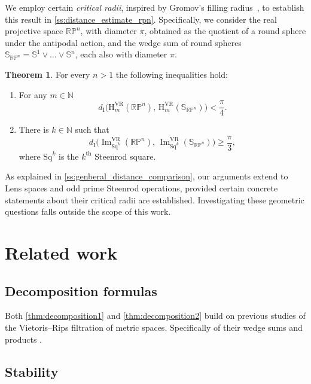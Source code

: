 \documentclass{amsart}
\theoremstyle{definition}
\newcommand{\N}{\mathbb{N}}
\renewcommand{\th}{\mathrm{th}}
\newcommand{\rH}{\mathrm{H}}
\newcommand{\bS}{\mathbb{S}}
\newcommand{\VR}{\mathrm{VR}}
\newcommand{\Sq}{\mathrm{Sq}}
\theoremstyle{theorem}
\newtheorem{introtheorem}{Theorem}
\DeclareMathOperator{\img}{Im}
\newcommand{\rp}{\mathbb{RP}}
\newcommand{\di}{d_{\mathrm{I}}}
\begin{document}
We employ certain \textit{critical radii}, inspired by Gromov's filling radius~\cite{gromov1983filling}, to establish this result in \cref{ss:distance_estimate_rpn}.
Specifically, we consider the real projective space \(\rp^n\), with diameter \(\pi\), obtained as the quotient of a round sphere under the antipodal action, and the wedge sum of round spheres \(\bS_{\mathbb{RP}^n} = \bS^1 \vee \dots \vee \bS^n\), each also with diameter \(\pi\).

\begin{introtheorem}\label{thm:inequalities intro}
	For every \(n > 1\) the following inequalities hold:
	\begin{enumerate}
		\item For any \(m \in \N\)
		\[
		\di\Big(\rH^\VR_m(\rp^n),\, \rH^\VR_m(\bS_{\rp^n})\Big) < \frac{\pi}{4}.
		\]

		\item There is \(k \in \N\) such that
		\[
		\di\Big(\img_{\Sq^k}^\VR(\rp^n),\, \img_{\Sq^k}^\VR(\bS_{\rp^n})\Big) \geq \frac{\pi}{3},
		\]
		where \(\Sq^k\) is the \(k^\th\) Steenrod square.
	\end{enumerate}
\end{introtheorem}

\medskip As explained in \cref{ss:genberal_distance_comparison}, our arguments extend to Lens spaces and odd prime Steenrod operations, provided certain concrete statements about their critical radii are established.
Investigating these geometric questions falls outside the scope of this work.

	


\section*{Related work}

\subsection*{Decomposition formulas}

Both \cref{thm:decomposition1} and \cref{thm:decomposition2} build on previous studies of the Vietoris--Rips filtration of metric spaces.
Specifically of their wedge sums \cite{adamaszek2020homotopy} and products \cite{adamaszek2017VietorisProduct, gakhar2019k, lim2024vietoris}.

\subsection*{Stability}
\end{document}
